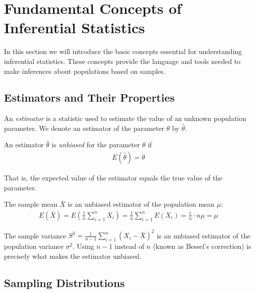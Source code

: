 \section*{Fundamental Concepts of Inferential Statistics}

In this section we will introduce the basic concepts essential for understanding inferential statistics. These concepts provide the language and tools needed to make inferences about populations based on samples.

\subsection*{Estimators and Their Properties}

An \emph{estimator} is a statistic used to estimate the value of an unknown population parameter. We denote an estimator of the parameter $\theta$ by $\hat{\theta}$.

\begin{definicion}
	\label{def:5.1.1}
	An estimator $\hat{\theta}$ is \emph{unbiased} for the parameter $\theta$ if
	\begin{align}
		E(\hat{\theta}) = \theta
	\end{align}

	That is, the expected value of the estimator equals the true value of the parameter.
\end{definicion}

\begin{ejemplo}
	\label{exmp:sample-mean-unbiased}
	The sample mean $\bar{X}$ is an unbiased estimator of the population mean $\mu$:
	\begin{align}
		E(\bar{X}) = E\left(\frac{1}{n}\sum_{i=1}^n X_i\right) = \frac{1}{n}\sum_{i=1}^n E(X_i) = \frac{1}{n} \cdot n\mu = \mu
	\end{align}
\end{ejemplo}

\begin{observacion}
	The sample variance $S^2 = \frac{1}{n-1}\sum_{i=1}^n (X_i - \bar{X})^2$ is an unbiased estimator of the population variance $\sigma^2$. Using $n-1$ instead of $n$ (known as Bessel's correction) is precisely what makes the estimator unbiased.
\end{observacion}

\subsection*{Sampling Distributions}


